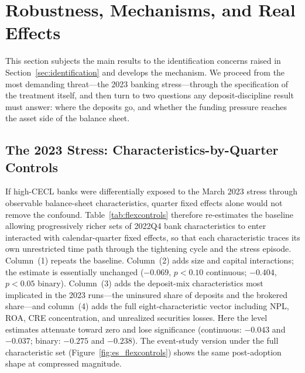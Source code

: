 
\section{Robustness, Mechanisms, and Real Effects}
\label{sec:robustness}

This section subjects the main results to the identification concerns raised
in Section~\ref{sec:identification} and develops the mechanism.  We proceed
from the most demanding threat---the 2023 banking stress---through the
specification of the treatment itself, and then turn to two questions any
deposit-discipline result must answer: where the deposits go, and whether the
funding pressure reaches the asset side of the balance sheet.

\subsection{The 2023 Stress: Characteristics-by-Quarter Controls}
\label{sec:robustness:stress}

If high-CECL banks were differentially exposed to the March 2023 stress
through observable balance-sheet characteristics, quarter fixed effects alone
would not remove the confound.  Table~\ref{tab:flexcontrols} therefore
re-estimates the baseline allowing progressively richer sets of 2022Q4 bank
characteristics to enter interacted with calendar-quarter fixed effects, so
that each characteristic traces its own unrestricted time path through the
tightening cycle and the stress episode.  Column~(1) repeats the baseline.
Column~(2) adds size and capital interactions; the estimate is essentially
unchanged ($-0.069$, $p < 0.10$ continuous; $-0.404$, $p < 0.05$ binary).
Column~(3) adds the deposit-mix characteristics most implicated in the 2023
runs---the uninsured share of deposits and the brokered share---and
column~(4) adds the full eight-characteristic vector including NPL, ROA, CRE
concentration, and unrealized securities losses.  Here the level estimates
attenuate toward zero and lose significance (continuous: $-0.043$ and
$-0.037$; binary: $-0.275$ and $-0.238$).  The event-study version under the
full characteristic set (Figure~\ref{fig:es_flexcontrols}) shows the same
post-adoption shape at compressed magnitude.

